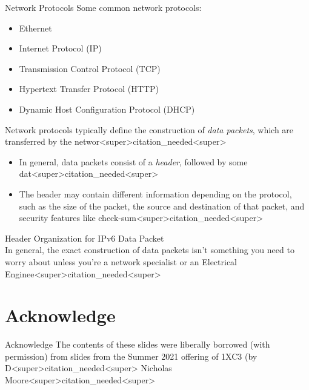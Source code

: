 \documentclass[11pt]{beamer}
\begin{document}

\begin{frame}{Network Protocols}
Some common network protocols:
\begin{itemize}
\item Ethernet
\item Internet Protocol (IP)
\item Transmission Control Protocol (TCP)
\item Hypertext Transfer Protocol (HTTP)
\item Dynamic Host Configuration Protocol (DHCP)
\end{itemize}
Network protocols typically define the construction of  \textit{data packets}, which are transferred by the networ<super>citation_needed<super>
\begin{itemize}
\item In general, data packets consist of a \textit{header}, followed by some dat<super>citation_needed<super>  
\item The header may contain different information depending on the protocol, such as the size of the packet, the source and destination of that packet, and security features like check-sum<super>citation_needed<super>  
\end{itemize}
\end{frame}

\begin{frame}{Header Organization for IPv6 Data Packet}
\center
\ \\
In general, the exact construction of data packets isn't something you need to worry about unless you're a network specialist or an Electrical Enginee<super>citation_needed<super>  
\end{frame}


\section[Acknowledge]{Acknowledge}
\begin{frame}{Acknowledge}
\center
\vspace{8em}
The contents of these slides were liberally borrowed (with permission) from slides from the Summer 2021 offering of 1XC3 (by D<super>citation_needed<super> Nicholas Moore<super>citation_needed<super>  
\end{frame}
\end{document}

